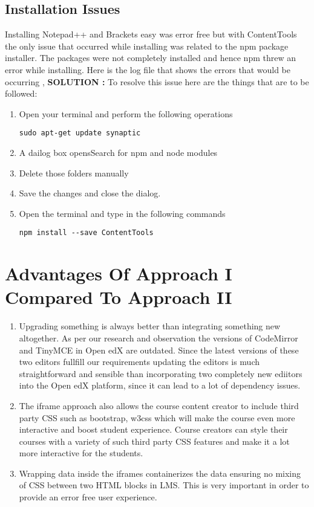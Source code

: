 \subsection{Installation Issues}
Installing Notepad++ and Brackets easy was error free but with ContentTools the only issue
that occurred while installing was related to the npm package installer. \newline
The packages were not completely installed and hence npm threw an error while
installing. \newline \newline
Here is the log file that shows the errors that would be occurring , \newline 
[\url{https://drive.google.com/open?id=1KUe3jcAPg8DpxmhshPUBYPKya_B-oRSt}]
\newline 
\newline
\textbf{SOLUTION :} To resolve this issue here are the things that are to be followed: \newline
\begin{enumerate}
\item Open your terminal and perform the following operations 
\begin{center}\verb=sudo apt-get update synaptic=\end{center}
\item A dailog box opensSearch for npm and node modules
\item Delete those folders manually
\item Save the changes and close the dialog.
\item Open the terminal and type in the following commands
 \begin{center}\verb=npm install --save ContentTools=\end{center}

\end{enumerate}
\section{Advantages Of Approach I Compared To Approach II}
\begin{enumerate}
\item Upgrading something is always better than integrating something new altogether. As per
our research and observation the versions of CodeMirror and TinyMCE in Open edX are
outdated. Since the latest versions of these two editors fullfill our requirements updating the
editors is much straightforward and sensible than incorporating two completely new ediitors
into the Open edX platform, since it can lead to a lot of dependency issues.
\item The iframe approach also allows the course content creator to include third party CSS
such as bootstrap, w3css which will make the course even more interactive and boost
student experience. Course creators can style their courses with a variety of such third party
CSS features and make it a lot more interactive for the students.
\item Wrapping data inside the iframes containerizes the data ensuring no mixing of CSS
between two HTML blocks in LMS. This is very important in order to provide an error free
user experience.
\end{enumerate}


